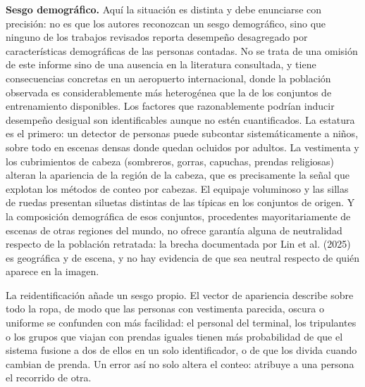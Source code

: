 \textbf{Sesgo demográfico.} Aquí la situación es distinta y debe
enunciarse con precisión: no es que los autores reconozcan un sesgo
demográfico, sino que ninguno de los trabajos revisados reporta
desempeño desagregado por características demográficas de las personas
contadas. No se trata de una omisión de este informe sino de una
ausencia en la literatura consultada, y tiene consecuencias concretas en
un aeropuerto internacional, donde la población observada es
considerablemente más heterogénea que la de los conjuntos de
entrenamiento disponibles. Los factores que razonablemente podrían
inducir desempeño desigual son identificables aunque no estén
cuantificados. La estatura es el primero: un detector de personas puede subcontar
sistemáticamente a niños, sobre todo en escenas densas donde quedan ocluidos
por adultos. La vestimenta
y los cubrimientos de cabeza (sombreros, gorras, capuchas, prendas
religiosas) alteran la apariencia de la región de la cabeza, que es
precisamente la señal que explotan los métodos de conteo por cabezas. El equipaje voluminoso
y las sillas de ruedas presentan siluetas distintas de las típicas en
los conjuntos de origen. Y la composición demográfica de esos conjuntos,
procedentes mayoritariamente de escenas de otras regiones del mundo, no
ofrece garantía alguna de neutralidad respecto de la población
retratada: la brecha documentada por Lin et al. (2025) es geográfica y
de escena, y no hay evidencia de que sea neutral respecto de quién
aparece en la imagen.

La reidentificación añade un sesgo propio. El vector de apariencia describe
sobre todo la ropa, de modo que las personas con vestimenta parecida, oscura o
uniforme se confunden con más facilidad: el personal del terminal, los
tripulantes o los grupos que viajan con prendas iguales tienen más
probabilidad de que el sistema fusione a dos de ellos en un solo identificador,
o de que los divida cuando cambian de prenda. Un error así no solo altera el
conteo: atribuye a una persona el recorrido de otra.

